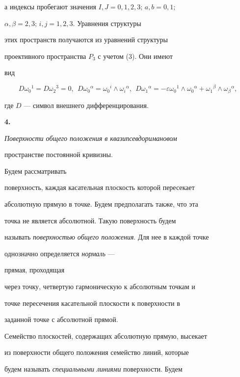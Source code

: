 а индексы пробегают значения $I,J=0,1,2,3$; $a,b=0,1$; 


$\alpha,\beta=2,3$; $i,j=1,2,3$. Уравнения структуры


этих пространств получаются из уравнений структуры


проективного пространства $P_3$ с учетом (3). Они имеют


вид


\begin{equation}


D \omega_0{}^1=D \omega_2{}^3=0,\ \ D\omega_0{}^\alpha=


\omega_0{}^i\wedge \omega_i{}^\alpha,


\ \ D\omega_1{}^\alpha=-\varepsilon\omega_0{}^1\wedge


\omega_0{}^\alpha+\omega_1{}^\beta\wedge\omega_\beta{}^\alpha,


\end{equation}


где $D$ --- символ внешнего дифференцирования.


\medskip





{\bf 4.} {\it Поверхности общего положения в квазипсевдоримановом


пространстве постоянной кривизны.} Будем рассматривать


поверхность, каждая касательная плоскость которой пересекает


абсолютную прямую в точке. Будем предполагать также, что эта


точка не является абсолютной. Такую поверхность будем


называть {\it поверхностью общего положения}. Для нее в каждой точке


однозначно определяется {\it нормаль} ---


прямая, проходящая


через точку, четвертую гармоническую к абсолютным точкам и


точке пересечения касательной плоскости к поверхности в


заданной точке с абсолютной прямой.





Семейство плоскостей, содержащих абсолютную прямую, высекает


из поверхности общего положения семейство линий, которые 


будем называть {\it специальными линиями} поверхности. Будем


